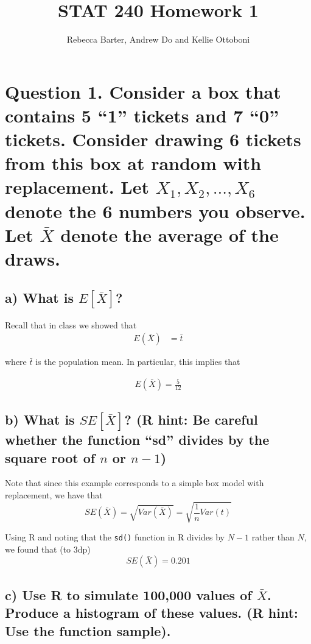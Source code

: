 \documentclass[11pt]{article}
\title{STAT 240 Homework 1}
\author{Rebecca Barter, Andrew Do and Kellie Ottoboni}
\begin{document}
\maketitle

 
 \section*{Question 1. Consider a box that contains 5 ``1'' tickets and 7 ``0'' tickets. Consider drawing 6 tickets from this box at random with replacement. Let $X_1, X_2, ..., X_6$ denote the 6 numbers you observe. Let $\bar{X}$ denote the average of the draws.}
 
 \subsection*{a) What is $E[\bar{X}]$?}
 \vspace{5mm}
 \noindent Recall that in class we showed that
 \begin{align*}
 E(\bar{X}) &= \bar{t}
 \end{align*}
 
 \noindent where $\bar{t}$ is the population mean. In particular, this implies that
 
\begin{align*}
E(\bar{X})= \frac{5}{12}
 \end{align*}
 
 
 \vspace{5mm}
 \subsection*{b) What is $SE[\bar{X}]$? (R hint: Be careful whether the function ``sd'' divides by the square root of $n$ or $n - 1$)}
  \vspace{5mm}
 \noindent Note that since this example corresponds to a simple box model with replacement, we have that
 $$SE(\bar{X}) = \sqrt{Var(\bar{X})} = \sqrt{\frac1n Var(t)}$$
 
 
 \noindent Using R and noting that the \texttt{sd()} function in R divides by $N-1$ rather than $N$, we found that (to 3dp)
 $$SE(\bar{X}) = 0.201$$
 

  \vspace{5mm}
 \subsection*{c) Use R to simulate 100,000 values of $\bar{X}$. Produce a histogram of these values. (R hint: Use the function sample).}
 
\end{document}
